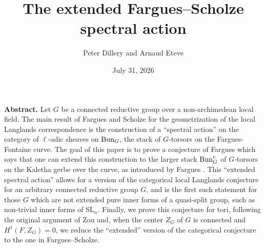 \documentclass[a4paper, 10pt, oneside, reqno]{amsart}
\title{The extended Fargues--Scholze spectral action}
\author{Peter Dillery and Arnaud Eteve}
\date{July 31, 2026}
\numberwithin{equation}{section}
\theoremstyle{plain}
\theoremstyle{definition}
\theoremstyle{remark}
\begin{document}
\maketitle

\textbf{Abstract.} Let $G$ be a connected reductive group over a non-archimedean local field. The main result of Fargues and Scholze \cite{Geometrization} for the geometrization of the local Langlands correspondence is the construction of a ``spectral action'' on the category of $\ell$-adic sheaves on $\mathrm{Bun}_G$, the stack of $G$-torsors on the Fargues-Fontaine curve. The goal of this paper is to prove a conjecture of Fargues which says that one can extend this construction to the larger stack $\mathrm{Bun}_G^e$ of $G$-torsors on the Kaletha gerbe over the curve, as introduced by Fargues \cite{Fargues22}. This ``extended spectral action'' allows for a version of the categorical local Langlands conjecture for an arbitrary connected reductive group $G$, and is the first such statement for those $G$ which are not extended pure inner forms of a quasi-split group, such as non-trivial inner forms of $\mathrm{SL}_{n}$. Finally, we prove this conjecture for tori, following the original argument of Zou \cite{Zou24} and, when the center $Z_{G}$ of $G$ is connected and $H^{1}(F,Z_{G})=0$, we reduce the ``extended'' version of the categorical conjecture to the one in Fargues--Scholze. 

\tableofcontents











\printbibliography
\end{document}
